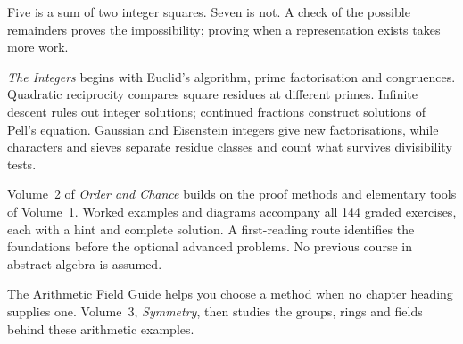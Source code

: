 Five is a sum of two integer squares. Seven is not. A check of the possible remainders proves the impossibility; proving when a representation exists takes more work.

\emph{The Integers} begins with Euclid's algorithm, prime factorisation and congruences. Quadratic reciprocity compares square residues at different primes. Infinite descent rules out integer solutions; continued fractions construct solutions of Pell's equation. Gaussian and Eisenstein integers give new factorisations, while characters and sieves separate residue classes and count what survives divisibility tests.

Volume~2 of \emph{Order and Chance} builds on the proof methods and elementary tools of Volume~1. Worked examples and diagrams accompany all 144 graded exercises, each with a hint and complete solution. A first-reading route identifies the foundations before the optional advanced problems. No previous course in abstract algebra is assumed.

The Arithmetic Field Guide helps you choose a method when no chapter heading supplies one. Volume~3, \emph{Symmetry}, then studies the groups, rings and fields behind these arithmetic examples.
